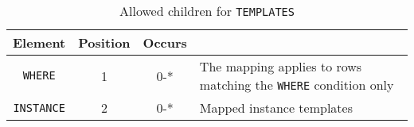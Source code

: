 \begin{table}[!htbp]
  \small
  \centering
  \begin{tabulary}{\linewidth}{|c |c |c|J|}
    \hline 
        \textbf{Element} &
        \textbf{Position} &
        \textbf{Occurs} &
        \\
    \hline
    \hline  
        \texttt{WHERE}  &        
        1 &           
        0-* &
        The mapping applies to rows matching the \texttt{WHERE} condition only\\
    \hline    
        \texttt{INSTANCE} &           
        2 &           
        0-* &
        Mapped instance templates\\
    \hline 
  \end{tabulary}
  \caption{Allowed children for \texttt{TEMPLATES}} 
  \label{tbl:templates-children}
\end{table}
